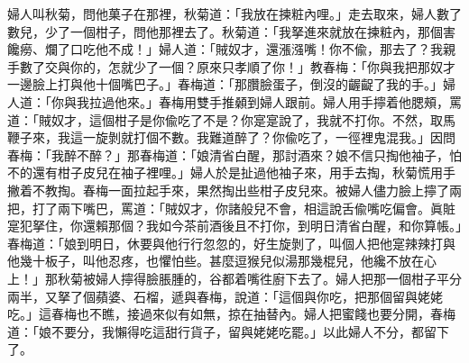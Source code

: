 婦人叫秋菊，問他菓子在那裡，秋菊道：「我放在揀粧內哩。」走去取來，婦人數了數兒，少了一個柑子，{}問他那裡去了。秋菊道：「我拏進來就放在揀粧內，那個害饞癆、爛了口吃他不成！」婦人道：「賊奴才，還漲漒嘴！你不偸，那去了？我親手數了交與你的，怎就少了一個？原來只孝順了你！」教春梅：「你與我把那奴才一邊臉上打與他十個嘴巴子。」春梅道：「那臢臉蛋子，倒沒的齷齪了我的手。」婦人道：「你與我拉過他來。」春梅用雙手推顙到婦人跟前。婦人用手擰着他腮頰，罵道：「賊奴才，這個柑子是你偸吃了不是？你寔寔說了，我就不打你。不然，取馬鞭子來，我這一旋剝就打個不數。我難道醉了？你偸吃了，一徑裡鬼混我。」因問春梅：「我醉不醉？」{}那春梅道：「娘清省白醒，那討酒來？{}娘不信只掏他袖子，怕不的還有柑子皮兒在袖子裡哩。」婦人於是扯過他袖子來，用手去掏，秋菊慌用手撇着不教掏。春梅一面拉起手來，果然掏出些柑子皮兒來。{}被婦人儘力臉上擰了兩把，打了兩下嘴巴，罵道：「賊奴才，你諸般兒不會，相這說舌偸嘴吃偏會。眞賍寔犯拏住，你還賴那個？我如今茶前酒後且不打你，{}到明日清省白醒，和你算帳。」春梅道：「娘到明日，休要與他行行忽忽的，好生旋剝了，叫個人把他寔辣辣打與他幾十板子，叫他忍疼，也懼怕些。甚麼逗猴兒似湯那幾棍兒，他纔不放在心上！」那秋菊被婦人擰得臉脹腫的，谷都着嘴徃廚下去了。婦人把那一個柑子平分兩半，又拏了個蘋婆、石榴，遞與春梅，說道：「這個與你吃，把那個留與姥姥吃。」這春梅也不瞧，接過來似有如無，掠在抽替內。婦人把蜜餞也要分開，春梅道：「娘不要分，我懶得吃這甜行貨子，留與姥姥吃罷。」以此婦人不分，都留下了。

